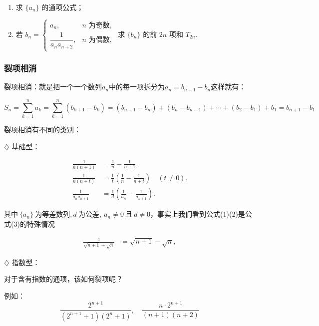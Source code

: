 \documentclass{article}
\begin{document}
\begin{enumerate}
    \item 求 \(\{a_n\}\) 的通项公式；
    \item 若 \(b_n = \begin{cases}
    a_n, & n \text{ 为奇数}, \\
    \dfrac{1}{a_n a_{n+2}}, & n \text{ 为偶数},
    \end{cases}\) 求 \(\{b_n\}\) 的前 \(2n\) 项和 \(T_{2n}\).
\end{enumerate}


\newpage


\subsubsection{裂项相消}

裂项相消：就是把一个一个数列$a_n$中的每一项拆分为$a_n=b_{n+1}-b_n$这样就有：

$$S_n=\sum_{k=1}^n a_k=\sum_{k=1}^n (b_{k+1}-b_k)=(b_{n+1}-b_n)+(b_n-b_{n-1})+\cdots+(b_2-b_1)+b_1=b_{n+1}-b_1$$
\vspace{1\baselineskip}

裂项相消有不同的类别：
\vspace{1\baselineskip}

$\diamondsuit$ 基础型：
\vspace{1\baselineskip}

\begin{align}
\frac{1}{n(n+1)} &= \frac{1}{n} - \frac{1}{n+1}, \label{eq:split1} \\
\frac{1}{n(n+t)} &= \frac{1}{t}\left( \frac{1}{n} - \frac{1}{n+t} \right) \quad (t \neq 0). \label{eq:split3}\\
\frac{1}{a_n a_{n+1}} &= \frac{1}{d}\left( \frac{1}{a_n} - \frac{1}{a_{n+1}} \right).
\end{align}

$\text{其中}\ \{a_n\}\ \text{为等差数列}, d\ \text{为公差}, \ a_n \neq 0\ \text{且}\ d \neq 0$，事实上我们看到公式(1)(2)是公式(3)的特殊情况

\begin{align}
\frac{1}{\sqrt{n+1}+\sqrt{n}} &= \sqrt{n+1} - \sqrt{n},
\end{align}



$\diamondsuit$ 指数型：
\vspace{1\baselineskip}

对于含有指数的通项，该如何裂项呢？

例如：
\[
\frac{2^{n+1}}{(2^{n+1}+1)(2^n+1)},\quad \frac{n\cdot 2^{n+1}}{(n+1)(n+2)}
\]
\end{document}
